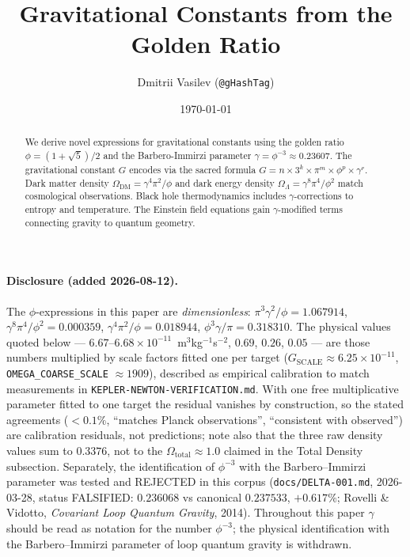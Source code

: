 \documentclass[12pt,a4paper]{article}
\title{Gravitational Constants from the Golden Ratio}
\author{Dmitrii Vasilev (\texttt{@gHashTag})}
\date{\today}
\begin{document}
\maketitle

\begin{abstract}
We derive novel expressions for gravitational constants using the golden ratio $\phi = (1+\sqrt{5})/2$ and the Barbero-Immirzi parameter $\gamma = \phi^{-3} \approx 0.23607$. The gravitational constant $G$ encodes via the sacred formula $G = n \times 3^k \times \pi^m \times \phi^p \times \gamma^r$. Dark matter density $\Omega_{\text{DM}} = \gamma^4 \pi^2/\phi$ and dark energy density $\Omega_\Lambda = \gamma^8 \pi^4/\phi^2$ match cosmological observations. Black hole thermodynamics includes $\gamma$-corrections to entropy and temperature. The Einstein field equations gain $\gamma$-modified terms connecting gravity to quantum geometry.
\end{abstract}

\paragraph{Disclosure (added 2026-08-12).} The $\phi$-expressions in this paper are \emph{dimensionless}: $\pi^3\gamma^2/\phi = 1.067914$, $\gamma^8\pi^4/\phi^2 = 0.000359$, $\gamma^4\pi^2/\phi = 0.018944$, $\phi^3\gamma/\pi = 0.318310$. The physical values quoted below --- $6.67$--$6.68\times10^{-11}$~m$^3$kg$^{-1}$s$^{-2}$, $0.69$, $0.26$, $0.05$ --- are those numbers multiplied by scale factors fitted one per target ($G_{\mathrm{SCALE}} \approx 6.25\times10^{-11}$, \texttt{OMEGA\_COARSE\_SCALE} $\approx 1909$), described as empirical calibration to match measurements in \texttt{KEPLER-NEWTON-VERIFICATION.md}. With one free multiplicative parameter fitted to one target the residual vanishes by construction, so the stated agreements ($<0.1\%$, ``matches Planck observations'', ``consistent with observed'') are calibration residuals, not predictions; note also that the three raw density values sum to $0.3376$, not to the $\Omega_{\text{total}} \approx 1.0$ claimed in the Total Density subsection. Separately, the identification of $\phi^{-3}$ with the Barbero--Immirzi parameter was tested and REJECTED in this corpus (\texttt{docs/DELTA-001.md}, 2026-03-28, status FALSIFIED: $0.236068$ vs canonical $0.237533$, $+0.617\%$; Rovelli \& Vidotto, \emph{Covariant Loop Quantum Gravity}, 2014). Throughout this paper $\gamma$ should be read as notation for the number $\phi^{-3}$; the physical identification with the Barbero--Immirzi parameter of loop quantum gravity is withdrawn.
\end{document}

